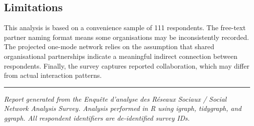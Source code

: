 \documentclass[
  letterpaper,
  DIV=11,
  numbers=noendperiod]{scrartcl}
\begin{document}
\subsection{Limitations}\label{limitations}

This analysis is based on a convenience sample of 111 respondents. The
free-text partner naming format means some organisations may be
inconsistently recorded. The projected one-mode network relies on the
assumption that shared organisational partnerships indicate a meaningful
indirect connection between respondents. Finally, the survey captures
reported collaboration, which may differ from actual interaction
patterns.

\begin{center}\rule{0.5\linewidth}{0.5pt}\end{center}

\emph{Report generated from the Enquête d'analyse des Réseaux Sociaux /
Social Network Analysis Survey. Analysis performed in R using igraph,
tidygraph, and ggraph. All respondent identifiers are de-identified
survey IDs.}
\end{document}
